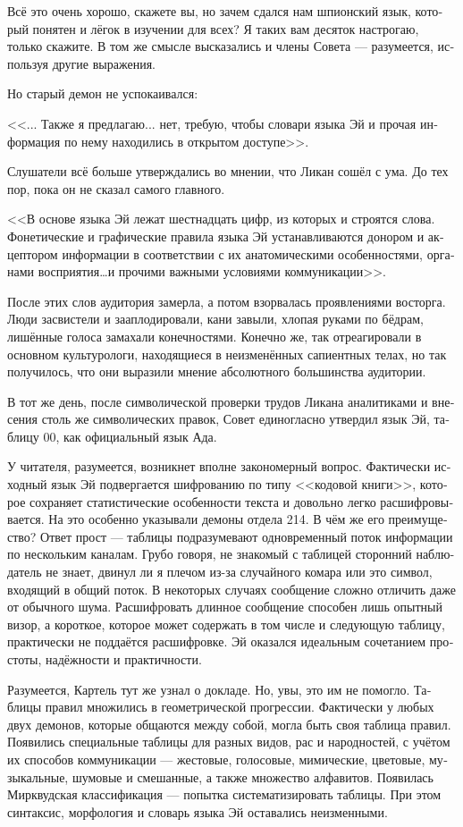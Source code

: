 \documentclass[a4paper,12pt,fleqn]{book}\usepackage{polyglossia}\setdefaultlanguage[babelshorthands=true]{russian}\setotherlanguage{english}\defaultfontfeatures{Ligatures=TeX,Mapping=tex-text}\usepackage{xcolor}\newcommand{\ml}[3]{#2}
\begin{document}
{Всё это очень хорошо, скажете вы, но зачем сдался нам шпионский язык, который понятен и лёгок в изучении для всех?
Я таких вам десяток настрогаю, только скажите.
В том же смысле высказались и члены Совета --- разумеется, используя другие выражения.

Но старый демон не успокаивался:

<<... Также я предлагаю... нет, требую, чтобы словари языка Эй и прочая информация по нему находились в открытом доступе>>.

Слушатели всё больше утверждались во мнении, что Ликан сошёл с ума.
До тех пор, пока он не сказал самого главного.

<<В основе языка Эй лежат шестнадцать цифр, из которых и строятся слова.
Фонетические и графические правила языка Эй устанавливаются донором и акцептором информации в соответствии с их анатомическими особенностями, органами восприятия\ldots и прочими важными условиями коммуникации>>.

После этих слов аудитория замерла, а потом взорвалась проявлениями восторга.
Люди засвистели и зааплодировали, кани завыли, хлопая руками по бёдрам, лишённые голоса замахали конечностями.
Конечно же, так отреагировали в основном культурологи, находящиеся в неизменённых сапиентных телах, но так получилось, что они выразили мнение абсолютного большинства аудитории.

В тот же день, после символической проверки трудов Ликана аналитиками и внесения столь же символических правок, Совет единогласно утвердил язык Эй, таблицу 00, как официальный язык Ада.

У читателя, разумеется, возникнет вполне закономерный вопрос.
Фактически исходный язык Эй подвергается шифрованию по типу <<кодовой книги>>, которое сохраняет статистические особенности текста и довольно легко расшифровывается.
На это особенно указывали демоны отдела 214.
В чём же его преимущество?
Ответ прост --- таблицы подразумевают одновременный поток информации по нескольким каналам.
Грубо говоря, не знакомый с таблицей сторонний наблюдатель не знает, двинул ли я плечом из-за случайного комара или это символ, входящий в общий поток.
В некоторых случаях сообщение сложно отличить даже от обычного шума.
Расшифровать длинное сообщение способен лишь опытный визор, а короткое, которое может содержать в том числе и следующую таблицу, практически не поддаётся расшифровке.
Эй оказался идеальным сочетанием простоты, надёжности и практичности.

Разумеется, Картель тут же узнал о докладе.
Но, увы, это им не помогло.
Таблицы правил множились в геометрической прогрессии.
Фактически у любых двух демонов, которые общаются между собой, могла быть своя таблица правил.
Появились специальные таблицы для разных видов, рас и народностей, с учётом их способов коммуникации --- жестовые, голосовые, мимические, цветовые, музыкальные, шумовые и смешанные, а также множество алфавитов.
Появилась Мирквудская классификация --- попытка систематизировать таблицы.
При этом синтаксис, морфология и словарь языка Эй оставались неизменными.

}
\end{document}
